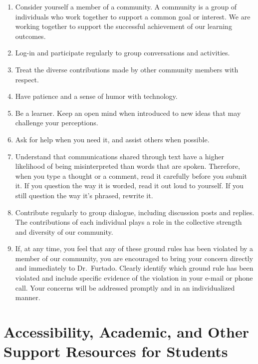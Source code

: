 \documentclass[
  letterpaper,
  DIV=11,
  numbers=noendperiod,
  oneside]{scrartcl}
\providecommand{\tightlist}{%
  \setlength{\itemsep}{0pt}\setlength{\parskip}{0pt}}\usepackage{longtable,booktabs,array}
\begin{document}
\begin{enumerate}
\def\labelenumi{\arabic{enumi}.}
\tightlist
\item
  Consider yourself a member of a community. A community is a group of
  individuals who work together to support a common goal or interest. We
  are working together to support the successful achievement of our
  learning outcomes.
\item
  Log-in and participate regularly to group conversations and
  activities.
\item
  Treat the diverse contributions made by other community members with
  respect.
\item
  Have patience and a sense of humor with technology.
\item
  Be a learner. Keep an open mind when introduced to new ideas that may
  challenge your perceptions.
\item
  Ask for help when you need it, and assist others when possible.
\item
  Understand that communications shared through text have a higher
  likelihood of being misinterpreted than words that are spoken.
  Therefore, when you type a thought or a comment, read it carefully
  before you submit it. If you question the way it is worded, read it
  out loud to yourself. If you still question the way it's phrased,
  rewrite it.
\item
  Contribute regularly to group dialogue, including discussion posts and
  replies. The contributions of each individual plays a role in the
  collective strength and diversity of our community.
\item
  If, at any time, you feel that any of these ground rules has been
  violated by a member of our community, you are encouraged to bring
  your concern directly and immediately to Dr.~Furtado. Clearly identify
  which ground rule has been violated and include specific evidence of
  the violation in your e-mail or phone call. Your concerns will be
  addressed promptly and in an individualized manner.
\end{enumerate}

\hypertarget{accessibility-academic-and-other-support-resources-for-students}{%
\section{Accessibility, Academic, and Other Support Resources for
Students}\label{accessibility-academic-and-other-support-resources-for-students}}
\end{document}
